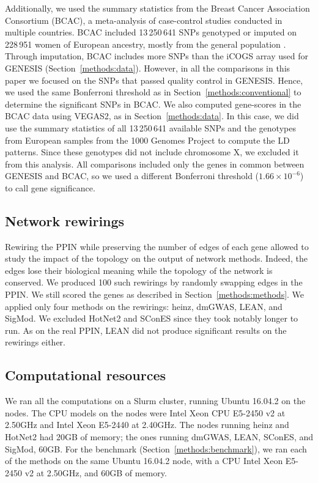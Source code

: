 \documentclass[10pt,letterpaper]{article}
\begin{document}
Additionally, we used the summary statistics from the Breast Cancer Association Consortium (BCAC), a meta-analysis of case-control studies conducted in multiple countries. BCAC included 13\,250\,641 SNPs genotyped or imputed on 228\,951 women of European ancestry, mostly from the general population \cite{Michailidou2017}. Through imputation, BCAC includes more SNPs than the iCOGS array used for GENESIS (Section~\ref{methods:data}). However, in all the comparisons in this paper we focused on the SNPs that passed quality control in GENESIS. Hence, we used the same Bonferroni threshold as in Section~\ref{methods:conventional} to determine the significant SNPs in BCAC. We also computed gene-scores in the BCAC data using VEGAS2, as in Section~\ref{methods:data}. In this case, we did use the summary statistics of all 13\,250\,641 available SNPs and the genotypes from European samples from the 1000 Genomes Project \cite{the_1000_genomes_project_consortium_global_2015} to compute the LD patterns. Since these genotypes did not include chromosome X, we excluded it from this analysis. All comparisons included only the genes in common between GENESIS and BCAC, so we used a different Bonferroni threshold ($1.66 \times 10^{-6}$) to call gene significance. 

\subsection{Network rewirings}
\label{methods:rewiring}

Rewiring the PPIN while preserving the number of edges of each gene allowed to study the impact of the topology on the output of network methods. Indeed, the edges lose their biological meaning while the topology of the network is conserved. We produced 100 such rewirings by randomly swapping edges in the PPIN. We still scored the genes as described in Section~\ref{methods:methods}. We applied only four methods on the rewirings: heinz, dmGWAS, LEAN, and SigMod. We excluded HotNet2 and SConES since they took notably longer to run. As on the real PPIN, LEAN did not produce significant results on the rewirings either.

\subsection{Computational resources}
\label{methods:computation}

We ran all the computations on a Slurm cluster, running Ubuntu 16.04.2 on the nodes. The CPU models on the nodes were Intel Xeon CPU E5-2450 v2 at 2.50GHz and Intel Xeon E5-2440 at 2.40GHz. The nodes running heinz and HotNet2 had 20GB of memory; the ones running dmGWAS, LEAN, SConES, and SigMod, 60GB. For the benchmark (Section~\ref{methods:benchmark}), we ran each of the methods on the same Ubuntu 16.04.2 node, with a CPU Intel Xeon E5-2450 v2 at 2.50GHz, and 60GB of memory.
\end{document}
